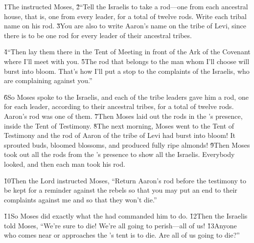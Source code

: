 \v{1}The  instructed Moses, \v{2}``Tell the Israelis to take a rod---one from each ancestral house, that is, one from every leader, for a total of twelve rods. Write each tribal name on his rod. \v{3}You are also to write Aaron's name on the tribe of Levi, since there is to be one rod for every leader of their ancestral tribes.

\v{4}``Then lay them there in the Tent of Meeting in front of the Ark of the Covenant where I'll meet with you. \v{5}The rod that belongs to the man whom I'll choose will burst into bloom. That's how I'll put a stop to the complaints of the Israelis, who are complaining against you.''

\v{6}So Moses spoke to the Israelis, and each of the tribe leaders gave him a rod, one for each leader, according to their ancestral tribes, for a total of twelve rods. Aaron's rod was one of them. \v{7}Then Moses laid out the rods in the 's presence, inside the Tent of Testimony. \v{8}The next morning, Moses went to the Tent of Testimony and the rod of Aaron of the tribe of Levi had burst into bloom! It sprouted buds, bloomed blossoms, and produced fully ripe almonds! \v{9}Then Moses took out all the rods from the 's presence to show all the Israelis. Everybody looked, and then each man took his rod.

\v{10}Then the Lord instructed Moses, ``Return Aaron's rod before the testimony to be kept for a reminder against the rebels so that you may put an end to their complaints against me and so that they won't die.''

\v{11}So Moses did exactly what the  had commanded him to do. \v{12}Then the Israelis told Moses, ``We're sure to die! We're all going to perish---all of us! \v{13}Anyone who comes near or approaches the 's tent is to die. Are all of us going to die?''


